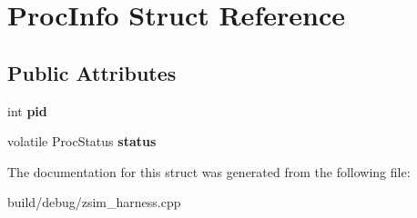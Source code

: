 \hypertarget{structProcInfo}{\section{Proc\-Info Struct Reference}
\label{structProcInfo}
}
\subsection*{Public Attributes}
\begin{DoxyCompactItemize}
\item 
\hypertarget{structProcInfo_a2f6d097d0ab711ee69981a6ba13a9618}{int {\bfseries pid}}\label{structProcInfo_a2f6d097d0ab711ee69981a6ba13a9618}

\item 
\hypertarget{structProcInfo_a8fe7da06d307285c0b4a0686271f9821}{volatile Proc\-Status {\bfseries status}}\label{structProcInfo_a8fe7da06d307285c0b4a0686271f9821}

\end{DoxyCompactItemize}


The documentation for this struct was generated from the following file\-:\begin{DoxyCompactItemize}
\item 
build/debug/zsim\-\_\-harness.\-cpp\end{DoxyCompactItemize}
